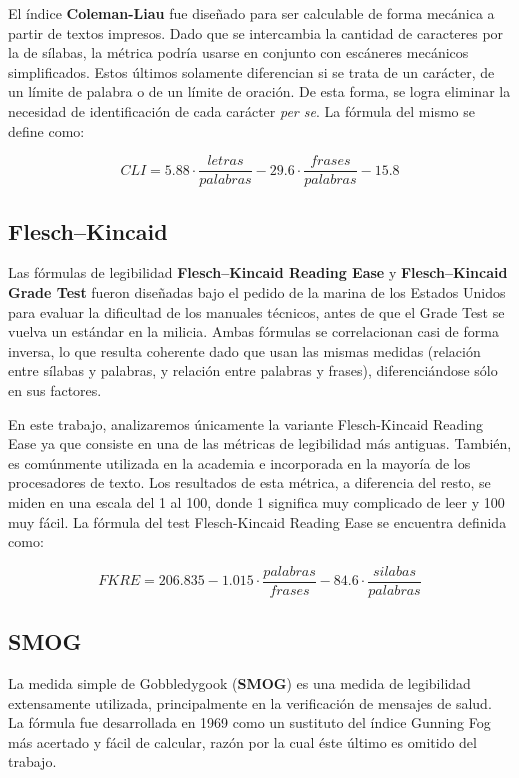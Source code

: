 \documentclass[12pt,journal,compsoc]{IEEEtran}
\begin{document}
El índice \textbf{Coleman-Liau}\cite{coleman-liau} fue diseñado para ser calculable de forma mecánica a partir de textos impresos. Dado que se intercambia la cantidad de caracteres por la de sílabas, la métrica podría usarse en conjunto con escáneres mecánicos simplificados. Estos últimos solamente diferencian si se trata de un carácter, de un límite de palabra o de un límite de oración. De esta forma, se logra eliminar la necesidad de identificación de cada carácter \textit{per se}.
La fórmula del mismo se define como:

$$CLI = 5.88 \cdot \frac{letras}{palabras} - 29.6 \cdot \frac{frases}{palabras} - 15.8$$


\subsection{Flesch–Kincaid}
Las fórmulas de legibilidad \textbf{Flesch–Kincaid Reading Ease}\cite{ari-flesch} y \textbf{Flesch–Kincaid Grade Test} fueron diseñadas bajo el pedido de la marina de los Estados Unidos para evaluar la dificultad de los manuales técnicos, antes de que el Grade Test se vuelva un estándar en la milicia. Ambas fórmulas se correlacionan casi de forma inversa, lo que resulta coherente dado que usan las mismas medidas (relación entre sílabas y palabras, y relación entre palabras y frases), diferenciándose sólo en sus factores.

En este trabajo, analizaremos únicamente la variante Flesch-Kincaid Reading Ease ya que consiste en una de las métricas de legibilidad más antiguas. También, es comúnmente utilizada en la academia e incorporada en la mayoría de los procesadores de texto. Los resultados de esta métrica, a diferencia del resto, se miden en una escala del 1 al 100, donde 1 significa muy complicado de leer y 100 muy fácil. La fórmula del test Flesch-Kincaid Reading Ease se encuentra definida como:

$$FKRE = 206.835 - 1.015\cdot \frac{palabras}{frases} - 84.6\cdot \frac{silabas}{palabras}$$

\subsection{SMOG}
La medida simple de Gobbledygook (\textbf{SMOG})\cite{smog} es una medida de legibilidad extensamente utilizada, principalmente en la verificación de mensajes de salud\cite{hedman}. La fórmula fue desarrollada en 1969 como un sustituto del índice Gunning Fog más acertado y fácil de calcular, razón por la cual éste último es omitido del trabajo.
\end{document}
